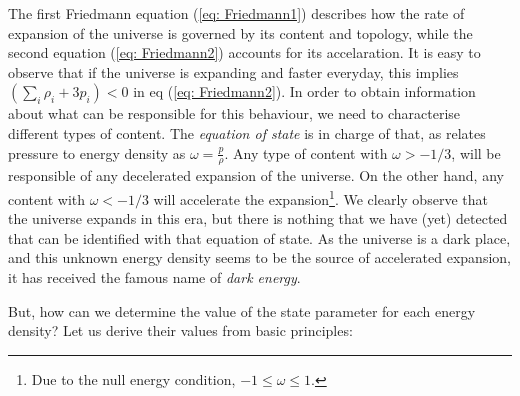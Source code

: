 \documentclass[11pt, a4paper]{article} %
\begin{document}
The first Friedmann equation (\ref{eq: Friedmann1}) describes how the rate of expansion of the universe is governed by its content and topology, while the second equation (\ref{eq: Friedmann2}) accounts for its accelaration. It is easy to observe that if the universe is expanding and faster everyday, this implies $\left(\sum_{i} \rho_{i} + 3 p_{i}\right) < 0$ in eq (\ref{eq: Friedmann2}). In order to obtain information about what can be responsible for this behaviour, we need to characterise different types of content. The \textit{equation of state} is in charge of that, as relates pressure to energy density as $\omega = \tfrac{p}{\rho}$. Any type of content with $\omega > - 1/3$, will be responsible of any decelerated expansion of the universe.  On the other hand, any content with $\omega < - 1/3$ will accelerate the expansion\footnote{Due to the null energy condition\cite{carroll2019spacetime}, $-1\leq\omega\leq 1$. }. We clearly observe that the universe expands in this era, but there is nothing that we have (yet) detected that can be identified with that equation of state. As the universe is a dark place, and this unknown energy density seems to be the source of accelerated expansion, it has received the famous name of \textit{dark energy}.

But, how can we determine the value of the state parameter for each energy density? Let us derive their values from basic principles:
\end{document}
